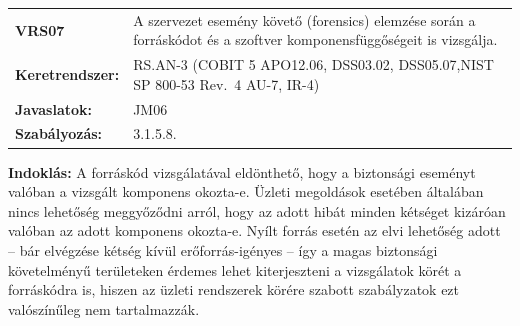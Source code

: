 \documentclass[12pt,magyar,a4paper,oneside]{scrreprt}
\begin{document}
\begin{longtable}[]{@{}ll@{}}
\toprule
\endhead
\begin{minipage}[t]{0.16\columnwidth}\raggedright
\textbf{VRS07}\strut
\end{minipage} & \begin{minipage}[t]{0.79\columnwidth}\raggedright
A szervezet esemény követő (forensics) elemzése során a forráskódot és a
szoftver komponensfüggőségeit is vizsgálja.\strut
\end{minipage}\tabularnewline
\begin{minipage}[t]{0.16\columnwidth}\raggedright
\textbf{Keretrendszer:}\strut
\end{minipage} & \begin{minipage}[t]{0.79\columnwidth}\raggedright
RS.AN-3 (COBIT 5 APO12.06, DSS03.02, DSS05.07,NIST SP 800-53 Rev.~4
AU-7, IR-4)\strut
\end{minipage}\tabularnewline
\begin{minipage}[t]{0.16\columnwidth}\raggedright
\textbf{Javaslatok:}\strut
\end{minipage} & \begin{minipage}[t]{0.79\columnwidth}\raggedright
JM06\strut
\end{minipage}\tabularnewline
\begin{minipage}[t]{0.16\columnwidth}\raggedright
\textbf{Szabályozás:}\strut
\end{minipage} & \begin{minipage}[t]{0.79\columnwidth}\raggedright
3.1.5.8.\strut
\end{minipage}\tabularnewline
\bottomrule
\end{longtable}

\textbf{Indoklás: } A forráskód vizsgálatával eldönthető, hogy a
biztonsági eseményt valóban a vizsgált komponens okozta-e. Üzleti
megoldások esetében általában nincs lehetőség meggyőződni arról, hogy az
adott hibát minden kétséget kizáróan valóban az adott komponens
okozta-e. Nyílt forrás esetén az elvi lehetőség adott -- bár elvégzése
kétség kívül erőforrás-igényes -- így a magas biztonsági követelményű
területeken érdemes lehet kiterjeszteni a vizsgálatok körét a
forráskódra is, hiszen az üzleti rendszerek körére szabott szabályzatok
ezt valószínűleg nem tartalmazzák.
\end{document}
